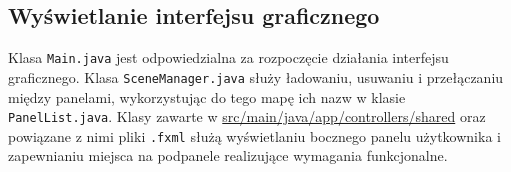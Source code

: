 \documentclass[a4paper,12pt]{article}
\begin{document}
\subsection{Wyświetlanie interfejsu graficznego}

Klasa \texttt{Main.java} jest odpowiedzialna za rozpoczęcie działania interfejsu graficznego.
Klasa \texttt{SceneManager.java} służy ładowaniu, usuwaniu i przełączaniu między panelami, wykorzystując do tego mapę ich nazw w klasie \texttt{PanelList.java}.
Klasy zawarte w \url{src/main/java/app/controllers/shared} oraz powiązane z nimi pliki \texttt{.fxml} służą wyświetlaniu bocznego panelu użytkownika i zapewnianiu miejsca na podpanele realizujące wymagania funkcjonalne.
\end{document}
